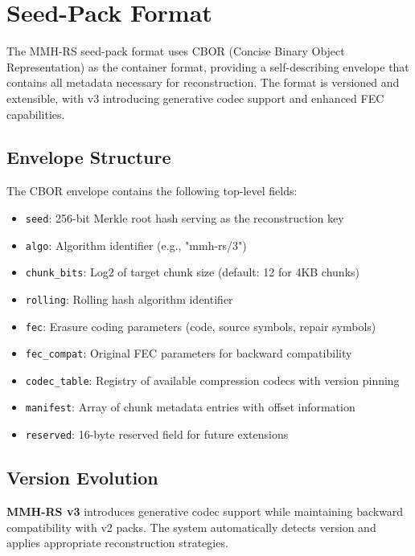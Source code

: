 \documentclass[11pt,a4paper]{article}
\begin{document}
	\section{Seed-Pack Format}
	\label{sec:format}
	
	The MMH-RS seed-pack format uses CBOR (Concise Binary Object Representation) as the container format, providing a self-describing envelope that contains all metadata necessary for reconstruction. The format is versioned and extensible, with v3 introducing generative codec support and enhanced FEC capabilities.
	
	\subsection{Envelope Structure}
	
	The CBOR envelope contains the following top-level fields:
	\begin{itemize}
		\item \texttt{seed}: 256-bit Merkle root hash serving as the reconstruction key
		\item \texttt{algo}: Algorithm identifier (e.g., "mmh-rs/3")
		\item \texttt{chunk\_bits}: Log2 of target chunk size (default: 12 for 4KB chunks)
		\item \texttt{rolling}: Rolling hash algorithm identifier
		\item \texttt{fec}: Erasure coding parameters (code, source symbols, repair symbols)
		\item \texttt{fec\_compat}: Original FEC parameters for backward compatibility
		\item \texttt{codec\_table}: Registry of available compression codecs with version pinning
		\item \texttt{manifest}: Array of chunk metadata entries with offset information
		\item \texttt{reserved}: 16-byte reserved field for future extensions
	\end{itemize}
	
	\subsection{Version Evolution}
	
	\begin{calloutbox}
	\textbf{MMH-RS v3} introduces generative codec support while maintaining backward compatibility with v2 packs. The system automatically detects version and applies appropriate reconstruction strategies.
	\end{calloutbox}
	
\end{document}
